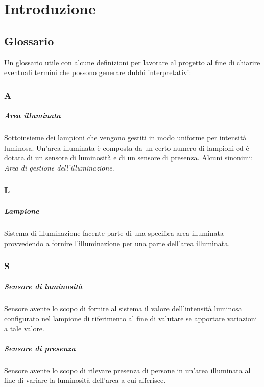 \chapter{Introduzione}

\section{Glossario}
Un glossario utile con alcune definizioni per lavorare al progetto al fine di chiarire eventuali termini che possono generare dubbi interpretativi:

\subsection*{A}

\paragraph{Area illuminata} Sottoinsieme dei lampioni che vengono gestiti in modo uniforme per intensità luminosa. Un'area illuminata è composta da un certo numero di lampioni ed è dotata di un sensore di luminosità e di un sensore di presenza. Alcuni sinonimi: \textit{Area di gestione dell'illuminazione}.

\subsection*{L}
\paragraph{Lampione} Sistema di illuminazione facente parte di una specifica area illuminata provvedendo a fornire l'illuminazione per una parte dell'area illuminata. 

\subsection*{S}
\paragraph{Sensore di luminosità} Sensore avente lo scopo di fornire al sistema il valore dell'intensità luminosa configurato nel lampione di riferimento al fine di valutare se apportare variazioni a tale valore.

\paragraph{Sensore di presenza} Sensore avente lo scopo di rilevare presenza di persone in un'area illuminata al fine di variare la luminosità dell'area a cui afferisce.

